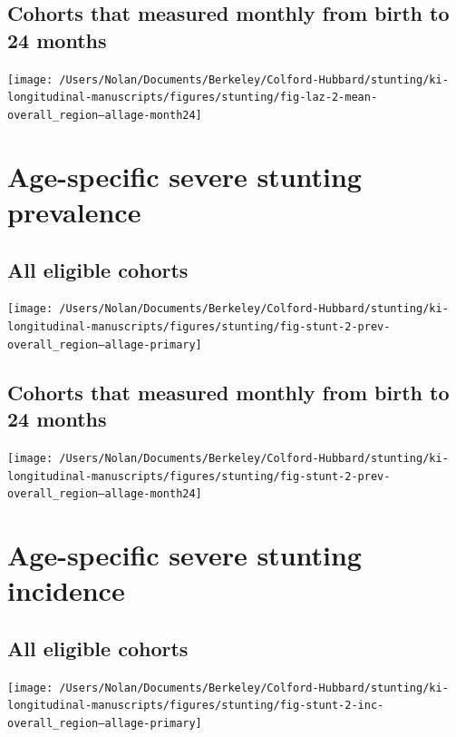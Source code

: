 \documentclass[9pt,]{book}
\begin{document}
\subsection{Cohorts that measured monthly from birth to 24
months}\label{cohorts-that-measured-monthly-from-birth-to-24-months}

\texttt{[image: /Users/Nolan/Documents/Berkeley/Colford-Hubbard/stunting/ki-longitudinal-manuscripts/figures/stunting/fig-laz-2-mean-overall\_region--allage-month24]}

\section{Age-specific severe stunting
prevalence}\label{age-specific-severe-stunting-prevalence-1}

\subsection{All eligible cohorts}\label{all-eligible-cohorts-1}

\texttt{[image: /Users/Nolan/Documents/Berkeley/Colford-Hubbard/stunting/ki-longitudinal-manuscripts/figures/stunting/fig-stunt-2-prev-overall\_region--allage-primary]}

\subsection{Cohorts that measured monthly from birth to 24
months}\label{cohorts-that-measured-monthly-from-birth-to-24-months-1}

\texttt{[image: /Users/Nolan/Documents/Berkeley/Colford-Hubbard/stunting/ki-longitudinal-manuscripts/figures/stunting/fig-stunt-2-prev-overall\_region--allage-month24]}

\section{Age-specific severe stunting
incidence}\label{age-specific-severe-stunting-incidence-1}

\subsection{All eligible cohorts}\label{all-eligible-cohorts-2}

\texttt{[image: /Users/Nolan/Documents/Berkeley/Colford-Hubbard/stunting/ki-longitudinal-manuscripts/figures/stunting/fig-stunt-2-inc-overall\_region--allage-primary]}
\end{document}
